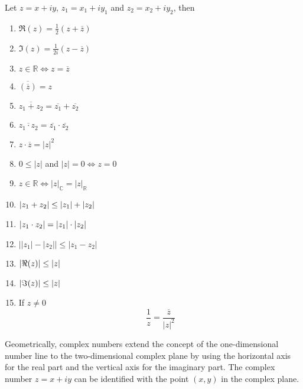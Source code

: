 \begin{proposition}
   Let \(z = x+iy\), \(z_1 = x_1 + iy_1\) and \(z_2 = x_2 + iy_2\), then
   \begin{enumerate}[label=\roman*, align=Center]
      \item \(\Re(z) = \frac{1}{2}(z + \overline{z})\)
      \item \(\Im(z) = \frac{1}{2i}(z - \overline{z})\)
      \item \(z \in \mathbb{R} \iff z = \overline{z}\)
      \item \(\overline{(\overline{z})} = z\)
      \item \(\overline{z_1 + z_2} = \overline{z_1} + \overline{z_2}\)
      \item \(\overline{z_1 \cdot z_2} = \overline{z_1} \cdot \overline{z_2}\)
      \item \(z \cdot \overline{z} = \lvert z \rvert^2\)
      \item \(0 \leq \lvert z\rvert\) and \(\lvert z\rvert = 0 \iff z = 0\)
      \item \(z \in \mathbb{R} \iff \lvert z \rvert_\mathbb{C} = \lvert z \rvert_\mathbb{R}\)
      \item \(\left\lvert z_1 + z_2\right\rvert \leq \left\lvert z_1\right\rvert + \left\lvert z_2\right\rvert\)
      \item \(\left\lvert z_1 \cdot z_2\right\rvert = \left\lvert z_1\right\rvert \cdot \left\lvert z_2\right\rvert\)
      \item \(\left\lvert \lvert z_1\rvert - \lvert z_2\rvert \right\rvert \leq \lvert z_1 - z_2\rvert\)
      \item \(\left\lvert\Re(z)\right\rvert \leq \left\lvert z\right\rvert\)
      \item \(\left\lvert\Im(z)\right\rvert \leq \left\lvert z\right\rvert\)
      \item If \(z \neq 0\)
         \[\frac{1}{z} = \frac{\overline{z}}{\lvert z \rvert^2}\]
   \end{enumerate}
\end{proposition}

Geometrically, complex numbers extend the concept of the one-dimensional number line to the two-dimensional complex plane by using the horizontal axis for the real part and the vertical axis for the imaginary part.
The complex number \(z = x + iy\) can be identified with the point \((x, y)\) in the complex plane.


